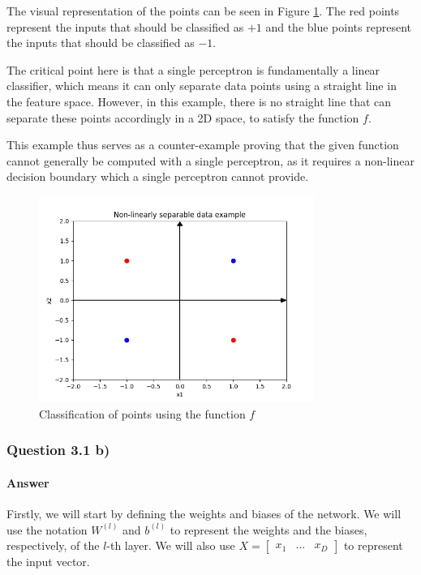 \documentclass{article}
\begin{document}
The visual representation of the points can be seen in Figure \ref{3a Plot}. The red points represent the inputs that should be classified as \( +1 \) and the blue points represent the inputs that should be classified as \( -1 \).

The critical point here is that a single perceptron is fundamentally a linear classifier, which means it can only separate data points using a straight line in the feature space. However, in this example, there is no straight line that can separate these points accordingly in a 2D space, to satisfy the function \( f \).

This example thus serves as a counter-example proving that the given function cannot generally be computed with a single perceptron, as it requires a non-linear decision boundary which a single perceptron cannot provide. 

\begin{figure}[H]
    \centering
    \includegraphics[width=0.8\textwidth]{"plots/3a.png"}
    \caption{Classification of points using the function \( f \)}
    \label{3a Plot}
\end{figure}
\subsubsection{Question 3.1 b)}
\paragraph{Answer}

Firstly, we will start by defining the weights and biases of the network. We will use the notation
\( W^{(l)} \) and \( b^{(l)} \) to represent the weights and the biases, respectively, of the \( l \)-th layer. 
We will also use $X = \begin{bmatrix}
    x_1 & ... & x_D
\end{bmatrix}
$ to represent the input vector.
\end{document}
